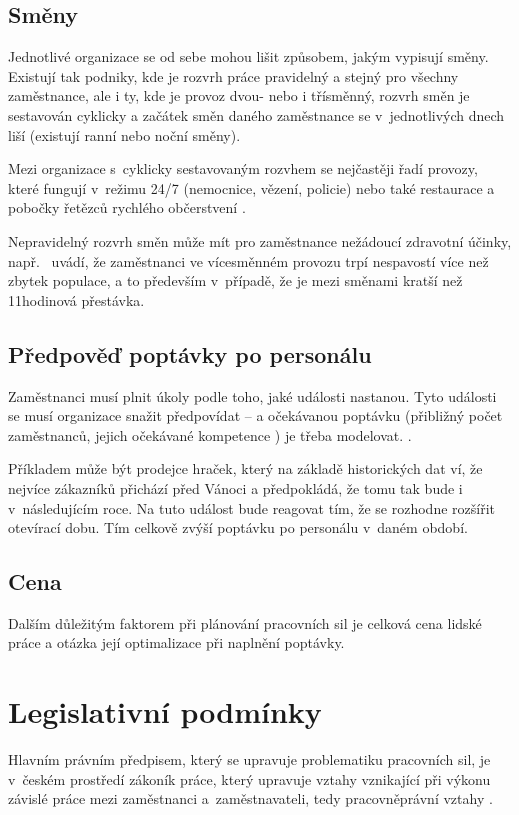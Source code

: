 \documentclass[twoside]{ctuthesis}
\begin{document}
\subsection{Směny}
\label{sub:smeny}
Jednotlivé organizace se od sebe mohou lišit způsobem, jakým vypisují směny. Existují tak podniky, kde je rozvrh práce pravidelný a stejný pro všechny zaměstnance, ale i ty, kde je provoz dvou- nebo i třísměnný, rozvrh směn je sestavován cyklicky a začátek směn daného zaměstnance se v~jed\-not\-li\-vý\-ch dnech liší (existují ranní nebo noční směny).

Mezi organizace s~cyklicky sestavovaným rozvhem se nejčastěji řadí provozy, které fungují v~režimu 24/7 (nemocnice, vězení, policie) nebo také restaurace a pobočky řetězců rychlého občerstvení \cite{bechtold1981work}.

Nepravidelný rozvrh směn může mít pro zaměstnance nežádoucí zdravotní účinky, např.~\cite{flo2013shift} uvádí, že zaměstnanci ve vícesměnném provozu trpí nespavostí více než zbytek populace, a to především v~případě, že je mezi směnami kratší než 11hodinová přestávka.

\subsection{Předpověď poptávky po personálu}
\label{sub:demand}
Zaměstnanci musí plnit úkoly podle toho, jaké události nastanou. Tyto události se musí organizace snažit předpovídat – a očekávanou poptávku (přibližný počet zaměstnanců, jejich očekávané kompetence \cite[s.~219]{armstrong2014}) je třeba modelovat. \cite{ernst2004staff}.

Příkladem může být prodejce hraček, který na základě historických dat ví, že nejvíce zákazníků přichází před Vánoci a předpokládá, že tomu tak bude i v~následujícím roce. Na tuto událost bude reagovat tím, že se rozhodne rozšířit otevírací dobu. Tím celkově zvýší poptávku po personálu v~daném období.

\subsection{Cena}
Dalším důležitým faktorem při plánování pracovních sil je celková cena lidské práce a otázka její optimalizace při naplnění poptávky.


\section{Legislativní podmínky}
\label{section:legislativa}
Hlavním právním předpisem, který se upravuje problematiku pracovních sil, je v~českém prostředí zákoník práce, který upravuje vztahy vznikající při výkonu závislé práce mezi zaměstnanci a~zaměstnavateli, tedy pracovněprávní vztahy \cite{zakonik06-262}.
\end{document}
